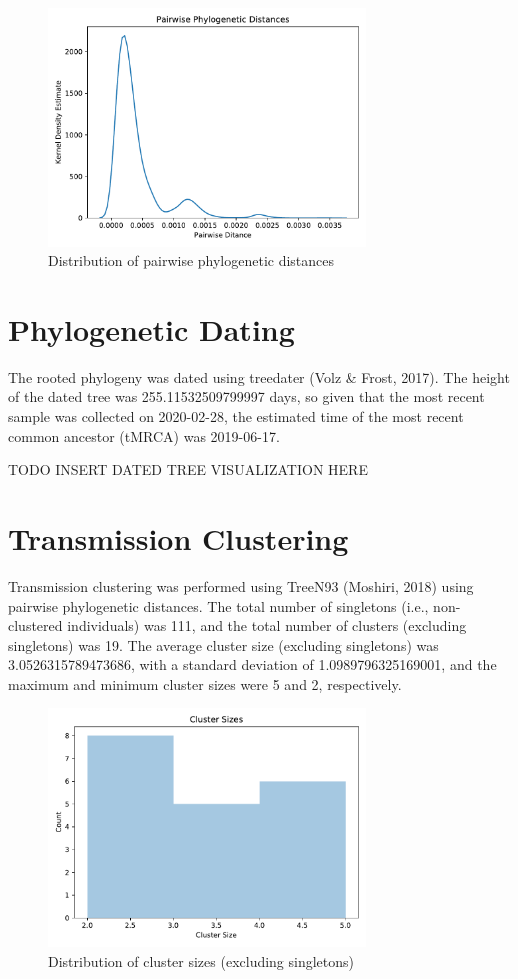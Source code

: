 \documentclass{article}
\begin{document}
\begin{figure}[h]
\centering
\includegraphics[width=0.75\textwidth]{./figs/pairwise_distances_tree.pdf}
\caption{Distribution of pairwise phylogenetic distances}
\end{figure}

\section{Phylogenetic Dating}
The rooted phylogeny was dated using treedater (Volz \& Frost, 2017).
The height of the dated tree was 255.11532509799997 days,
so given that the most recent sample was collected on 2020-02-28,
the estimated time of the most recent common ancestor (tMRCA) was 2019-06-17.


TODO INSERT DATED TREE VISUALIZATION HERE


\section{Transmission Clustering}
Transmission clustering was performed using TreeN93 (Moshiri, 2018) using pairwise phylogenetic distances.
The total number of singletons (i.e., non-clustered individuals) was 111,
and the total number of clusters (excluding singletons) was 19.
The average cluster size (excluding singletons) was 3.0526315789473686,
with a standard deviation of 1.0989796325169001,
and the maximum and minimum cluster sizes were 5 and 2, respectively.


\begin{figure}[h]
\centering
\includegraphics[width=0.75\textwidth]{./figs/cluster_sizes.pdf}
\caption{Distribution of cluster sizes (excluding singletons)}
\end{figure}
\end{document}
